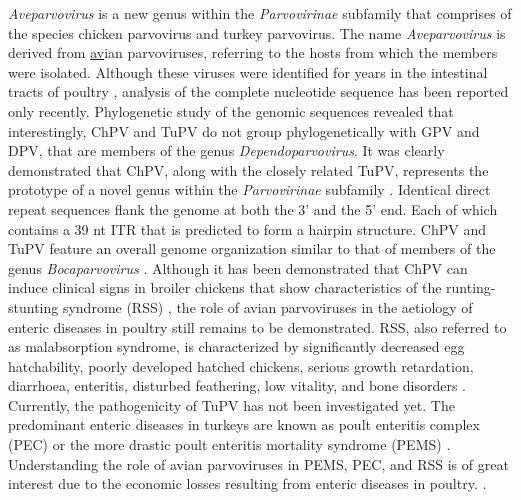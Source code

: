 \textit{Aveparvovirus} is a new genus within the \textit{Parvovirinae} subfamily that comprises of the species chicken parvovirus and turkey parvovirus. The name \textit{Aveparvovirus} is derived from \underline{av}ian parvoviruses, referring to the hosts from which the members were isolated. Although these viruses were identified for years in the intestinal tracts of poultry \cite{pmid18766849, pmid6847550, pmid2995561}, analysis of the complete nucleotide sequence has been reported only recently. Phylogenetic study of the genomic sequences revealed that interestingly, ChPV and TuPV do not group phylogenetically with GPV and DPV, that are members of the genus \textit{Dependoparvovirus}. It was clearly demonstrated that ChPV, along with the closely related TuPV, represents the prototype of a novel genus within the \textit{Parvovirinae} subfamily \cite{pmid25510852, pmid18622862}. Identical direct repeat sequences flank the genome at both the 3' and the 5' end. Each of which contains a 39 nt ITR that is predicted to form a hairpin structure. ChPV and TuPV feature an overall genome organization similar to that of members of the genus \textit{Bocaparvovirus} \cite{pmid20097398}. 
Although it has been demonstrated that ChPV can induce clinical signs in broiler chickens that show characteristics of the runting-stunting syndrome (RSS) \cite{pmid18766892}, the role of avian parvoviruses in the aetiology of enteric diseases in poultry still remains to be demonstrated. RSS, also referred to as malabsorption syndrome, is characterized by significantly decreased egg hatchability, poorly developed hatched chickens, serious growth retardation, diarrhoea, enteritis, disturbed feathering, low vitality, and bone disorders \cite{pmid7150147, pmid6281962, pmid8363509}. Currently, the pathogenicity of TuPV has not been investigated yet. The predominant enteric diseases in turkeys are known as poult enteritis complex (PEC) \cite{pmid10935280} or the more drastic poult enteritis mortality syndrome (PEMS) \cite{PEMS}. Understanding the role of avian parvoviruses in PEMS, PEC, and RSS is of great interest due to the economic losses resulting from enteric diseases in poultry. \cite{pmid18622862}. 
  
    





